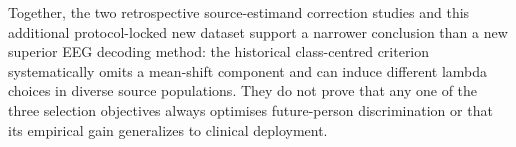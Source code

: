 Together, the two retrospective
source-estimand correction studies
and this additional protocol-locked
new dataset support a narrower
conclusion than a new superior
EEG decoding method: the
historical class-centred criterion
systematically omits a mean-shift
component and can induce
different lambda choices in diverse
source populations. They do
not prove that any one of the
three selection objectives
always optimises future-person
discrimination or that its
empirical gain generalizes
to clinical deployment.
